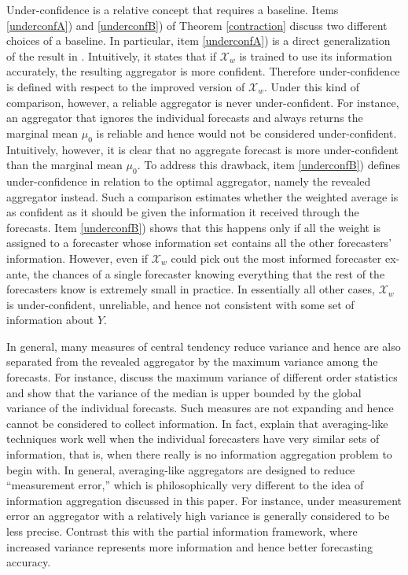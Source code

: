 \documentclass[11pt]{article}
\theoremstyle{definition}
\theoremstyle{definition}
\begin{document}
Under-confidence is a relative concept that requires a baseline. Items \ref{underconfA}) and \ref{underconfB}) of Theorem \ref{contraction} discuss two different choices of a baseline. In particular, item \ref{underconfA}) is a direct generalization of the result in \cite{Ranjan08}. Intuitively, it states that if $\mathcal{X}_w$ is trained to use its information accurately, the resulting aggregator is more confident. Therefore under-confidence is defined with respect to the improved version of  $\mathcal{X}_w$. Under this kind of comparison, however, a reliable aggregator is never under-confident. For instance, an aggregator that ignores the individual forecasts and always returns the marginal mean $\mu_0$ is reliable and hence would not be considered under-confident. Intuitively, however, it is clear that no aggregate forecast is more under-confident than the marginal mean $\mu_0$. To address this drawback, item \ref{underconfB}) defines under-confidence in relation to the optimal aggregator, namely the revealed aggregator instead. Such a comparison estimates whether the weighted average is as confident as it should be given the information it received through the forecasts. Item \ref{underconfB}) shows that this happens only if all the weight is assigned to a forecaster whose information set contains all the other forecasters' information. However, even if $\mathcal{X}_w$ could pick out the most informed forecaster ex-ante, the chances of a single forecaster knowing everything that the rest of the forecasters know is extremely small in practice. In essentially all other cases, $\mathcal{X}_w$ is under-confident, unreliable,  
and hence not consistent with some set of information about $Y$. 

In general, many measures of central tendency reduce variance and hence are also separated from the revealed aggregator by the maximum variance among the forecasts. For instance, \cite{papadatos1995maximum} discuss the maximum variance of different order statistics and show that the variance of the median is upper bounded by the global variance of the individual forecasts. Such measures are not expanding and hence cannot be considered to collect information. In fact, \cite{satopaamodeling} explain that averaging-like techniques work well when the individual forecasters have very similar sets of information, that is, when there really is no information aggregation problem to begin with. In general, averaging-like aggregators are designed to reduce ``measurement error,'' which is philosophically very different to the idea of information aggregation discussed in this paper. For instance, under measurement error an aggregator with a relatively high variance is generally considered to be less precise. Contrast this with the partial information framework, where increased variance represents more information and hence better forecasting accuracy.
\end{document}
